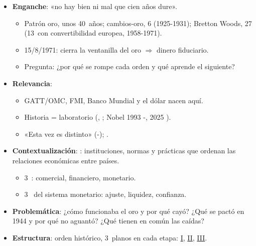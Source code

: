 \documentclass{article}
\begin{document}
\cabecerarepaso
\begin{columnas}

\begin{itemize}
\item \textbf{Enganche}: «no hay bien ni mal que cien años dure».
  \begin{itemize}
  \item Patrón oro, unos 40~años; cambios-oro, 6 (1925-1931); Bretton Woods, 27 (13~con convertibilidad europea, 1958-1971).
  \item 15/8/1971:  cierra la ventanilla del oro $\Rightarrow$ dinero fiduciario.
  \item Pregunta: ¿por qué se rompe cada orden y qué aprende el siguiente?
  \end{itemize}
\item \textbf{Relevancia}:
  \begin{itemize}
  \item GATT/OMC, FMI, Banco Mundial y el dólar nacen aquí.
  \item Historia = laboratorio (, ; Nobel 1993 -, 2025 ).
  \item «Esta vez es distinto» (-); .
  \end{itemize}
\item \textbf{Contextualización}: : instituciones, normas y prácticas que ordenan las relaciones económicas entre países.
  \begin{itemize}
  \item 3~: comercial, financiero, monetario.
  \item 3~ del sistema monetario: ajuste, liquidez, confianza.
  \end{itemize}
\item \textbf{Problemática}: ¿cómo funcionaba el oro y por qué cayó? ¿Qué se pactó en 1944 y por qué no aguantó? ¿Qué tienen en común las caídas?
\item \textbf{Estructura}: orden histórico, 3~planos en cada etapa: \hyperref[rep:I]{I}, \hyperref[rep:II]{II}, \hyperref[rep:III]{III}.
\end{itemize}


\end{columnas}
\end{document}
